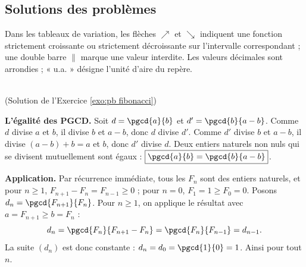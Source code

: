 \begin{corrige}
\section{Solutions des probl\`emes}
Dans les tableaux de variation, les fl\`eches $\nearrow$ et $\searrow$ indiquent une fonction strictement croissante ou
strictement d\'ecroissante sur l'intervalle correspondant ; une double barre $\|$ marque une valeur interdite.
Les valeurs d\'ecimales sont arrondies ; « u.a. » d\'esigne l'unit\'e d'aire du rep\`ere.

\begin{sol} ~ \\
(Solution de l'Exercice \ref{exo:pb fibonacci})

\textbf{L'\'egalit\'e des PGCD.} Soit $d = \pgcd{a}{b}$ et $d' = \pgcd{b}{a-b}$.
Comme $d$ divise $a$ et $b$, il divise $b$ et $a - b$, donc $d$ divise $d'$.
Comme $d'$ divise $b$ et $a - b$, il divise $(a - b) + b = a$ et $b$, donc $d'$ divise $d$.
Deux entiers naturels non nuls qui se divisent mutuellement sont \'egaux : $\boxed{\pgcd{a}{b} = \pgcd{b}{a-b}}$.

\textbf{Application.} Par r\'ecurrence imm\'ediate, tous les $F_n$ sont des entiers naturels, et pour $n \geq 1$,
$F_{n+1} - F_n = F_{n-1} \geq 0$ ; pour $n = 0$, $F_1 = 1 \geq F_0 = 0$.
Posons $d_n = \pgcd{F_{n+1}}{F_n}$. Pour $n \geq 1$, on applique le r\'esultat avec $a = F_{n+1} \geq b = F_n$ :
\[
	d_n = \pgcd{F_n}{F_{n+1} - F_n} = \pgcd{F_n}{F_{n-1}} = d_{n-1} .
\]
La suite $(d_n)$ est donc constante : $d_n = d_0 = \pgcd{1}{0} = 1$.
Ainsi  pour tout $n$.
\end{sol}


\end{corrige}
